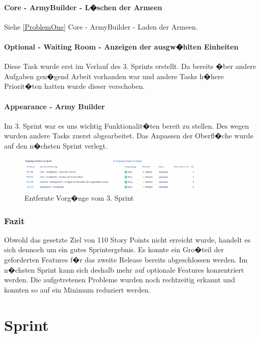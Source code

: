 \documentclass[12pt, titlepage]{scrartcl}
\newcommand{\RN}[1]{%
	\textup{\uppercase\expandafter{\romannumeral#1}}%
}
\begin{document}
			\paragraph{Core - ArmyBuilder - L�schen der Armeen} Siehe \ref{ProblemOne} Core - ArmyBuilder - Laden der Armeen.
			
			\paragraph{Optional - Waiting Room - Anzeigen der ausgw�hlten Einheiten} Diese Task wurde erst im Verlauf des 3. Sprints erstellt. Da bereits �ber andere Aufgaben gen�gend Arbeit vorhanden war und andere Tasks h�here Priorit�ten hatten wurde dieser verschoben.
			
			\paragraph{Appearance - Army Builder} Im 3. Sprint war es uns wichtig Funktionalit�ten bereit zu stellen. Des wegen wurden andere Tasks zuerst abgearbeitet. Das Anpassen der Oberfl�che wurde auf den n�chsten Sprint verlegt.
			\begin{figure}[H] 
				\centering
				\includegraphics[width=0.8\textwidth]{Aus_dem_Sprint_Entfernte_Vorgaenge_Sprint_3.PNG}
				\caption{Entfernte Vorg�nge vom 3. Sprint}
				\label{EntfernteVorgaengeSprint3}
			\end{figure}
		
		\subsubsection{Fazit}
		Obwohl das gesetzte Ziel von 110 Story Points nicht erreicht wurde, handelt es sich dennoch um ein gutes Sprintergebnis. Es konnte ein Gro�teil der geforderten Features f�r das zweite Release bereits abgeschlossen werden. Im n�chsten Sprint kann sich deshalb mehr auf optionale Features konzentriert werden. Die aufgetretenen Probleme wurden noch rechtzeitig erkannt und konnten so auf ein Minimum reduziert werden. 
		
	\section{Sprint \RN{4}}
\end{document}
